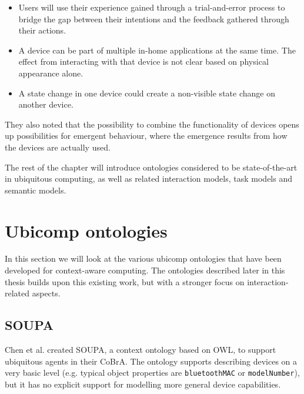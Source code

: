 \begin{itemize}
	\item Users will use their experience gained through a trial-and-error process to bridge the gap between their intentions and the feedback gathered through their actions.
	\item A device can be part of multiple in-home applications at the same time. The effect from interacting with that device is not clear based on physical appearance alone.
	\item A state change in one device could create a non-visible state change on another device.
\end{itemize}

They also noted that the possibility to combine the functionality of devices opens up possibilities for emergent behaviour, where the emergence results from how the devices are actually used. 

The rest of the chapter will introduce ontologies considered to be state-of-the-art  in ubiquitous computing, as well as related interaction models, task models and semantic models.

\section{Ubicomp ontologies}
\label{UbicompOntologies}
In this section we will look at the various ubicomp ontologies that have been developed for context-aware computing. The ontologies described later in this thesis builds upon this existing work, but with a stronger focus on interaction-related aspects. 
 

\subsection{SOUPA}

Chen et al. \cite{Chen2004} created \ac{SOUPA}, a context ontology based on \ac{OWL}, to support ubiquitous agents in their \ac{CoBrA}. The ontology supports describing devices on a very basic level (e.g. typical object properties are \texttt{bluetoothMAC} or \texttt{modelNumber}), but it has no explicit support for modelling more general device capabilities.


